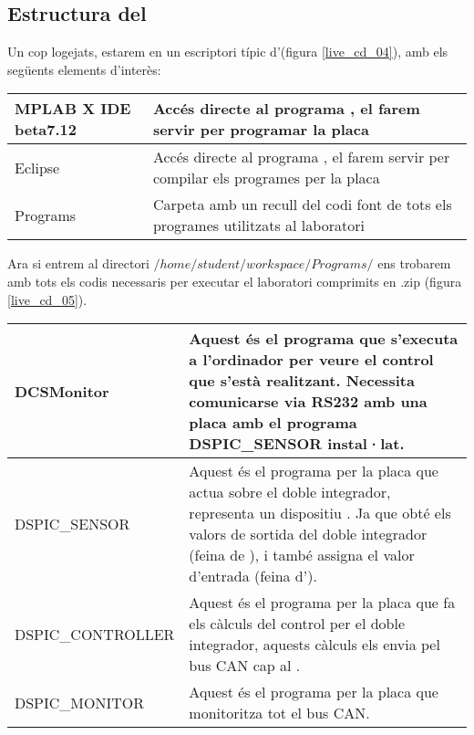 \subsection{Estructura del \LiveCD}\label{cap:gui:cd:struct}

Un cop logejats, estarem en un escriptori típic d'\Ubuntu (figura \ref{live_cd_04}), amb els següents elements d'interès:

\begin{center}
	\begin{tabularx}{\linewidth}{l | X}
		MPLAB X IDE beta7.12 &  Accés directe al programa \MplabX, el farem servir per programar la placa \FLEX\\
		\hline
		Eclipse & Accés directe al programa \Eclipse, el farem servir per compilar els programes per la placa \FLEX\\
		\hline
		Programs & Carpeta amb un recull del codi font de tots els programes utilitzats al laboratori  \\
	\end{tabularx}
	\label{tab:gui:cd:desk}
\end{center}


Ara si entrem al directori $/home/student/workspace/Programs/$ ens trobarem amb tots els codis necessaris per executar el laboratori comprimits en .zip (figura \ref{live_cd_05}).

\begin{center}
	\begin{tabularx}{\linewidth}{l | X}
		DCSMonitor & Aquest és el programa que s'executa a l'ordinador per veure el control que s'està realitzant. Necessita comunicarse via RS232 amb una placa \FLEX amb el programa DSPIC\_SENSOR instal·lat.\\
		\hline
		DSPIC\_SENSOR & Aquest és el programa per la placa \FLEX que actua sobre el doble integrador, representa un dispositiu \SensorActuador. Ja que obté els valors de sortida del doble integrador (feina de \Sensor), i també assigna el valor d'entrada (feina d'\Actuador).\\
		\hline
		DSPIC\_CONTROLLER & Aquest és el programa per la placa \FLEX que fa els càlculs del control per el doble integrador, aquests càlculs els envia pel bus CAN cap al \SensorActuador. \\
		\hline
		DSPIC\_MONITOR & Aquest és el programa per la placa \FLEX que monitoritza tot el bus CAN.  \\
	\end{tabularx}
	\label{tab:gui:cd:workspace}
\end{center}

